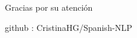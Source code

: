 \documentclass{beamer}
\begin{document}






\begin{frame}
\Huge{\centerline{Gracias por su atención}}
\vspace{\baselineskip}
\large{\centerline{github  : CristinaHG/Spanish-NLP}}
\end{frame}

\end{document}
